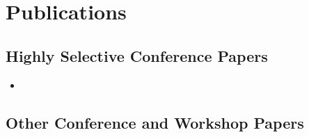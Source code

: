 \chapter{Publications}
\label{ch:publications}

\section{Highly Selective Conference Papers}
\nobibliography*{}
\begin{itemize}
	\item {}
\end{itemize}

\section{Other Conference and Workshop Papers}
